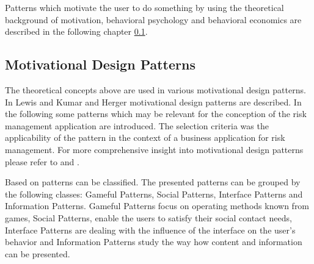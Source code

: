 Patterns which motivate the user to do something by using the theoretical background of motivation, behavioral psychology and behavioral economics are described in the following chapter \ref{sec:theoryBc}.


\newpage

\subsection{Motivational Design Patterns}
\label{sec:theoryBc}

The theoretical concepts above are used in various motivational design patterns. In Lewis \cite{lewisIrresistibleAppsMotivational2014} and Kumar and Herger \cite{kumarGamificationWorkDesigning2013} motivational design patterns are described. In the following some patterns which may be relevant for the conception of the risk management application are introduced. The selection criteria was the applicability of the pattern in the context of a business application for risk management. For more comprehensive insight into motivational design patterns please refer to \cite{lewisIrresistibleAppsMotivational2014} and \cite{kumarGamificationWorkDesigning2013}.

Based on \cite{lewisIrresistibleAppsMotivational2014} patterns can be classified. The presented patterns can be grouped by the following classes: Gameful Patterns, Social Patterns, Interface Patterns and Information Patterns. Gameful Patterns focus on operating methods known from games, Social Patterns, enable the users to satisfy their social contact needs, Interface Patterns are dealing with the influence of the interface on the user's behavior and Information Patterns study the way how content and information can be presented. \cite[p. 4, 5, 6]{lewisIrresistibleAppsMotivational2014}

